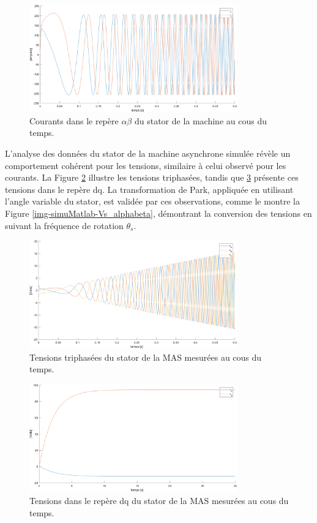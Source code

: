 \begin{figure}[!h]
    \centering
    \includegraphics[width=0.8\textwidth]{simusMATLAB/MAS/is_alphabeta.png} 
    \caption{Courants dans le repère $\alpha\beta$ du stator de la machine au cous du temps.}
    \label{img-simuMatlab-is_alphabeta}
\end{figure}

L'analyse des données du stator de la machine asynchrone simulée révèle un comportement cohérent pour les tensions, similaire à celui observé pour les courants. La Figure \ref{img-simuMatlab-vs_abc} illustre les tensions triphasées, tandis que \ref{img-simuMatlab-Vs_dq} présente ces tensions dans le repère dq. La transformation de Park, appliquée en utilisant l'angle variable du stator, est validée par ces observations, comme le montre la Figure \ref{img-simuMatlab-Vs_alphabeta}, démontrant la conversion des tensions en suivant la fréquence de rotation \(\theta_s\).


\begin{figure}[!h]
    \centering
    \includegraphics[width=0.8\textwidth]{simusMATLAB/MAS/vs_abc.png} 
    \caption{Tensions triphasées du stator de la MAS mesurées au cous du temps.}
    \label{img-simuMatlab-vs_abc}
\end{figure}

\begin{figure}[!h]
    \centering
    \includegraphics[width=0.8\textwidth]{simusMATLAB/MAS/Vs_dq.png} 
    \caption{Tensions dans le repère dq du stator de la MAS mesurées au cous du temps.}
    \label{img-simuMatlab-Vs_dq}
\end{figure}


